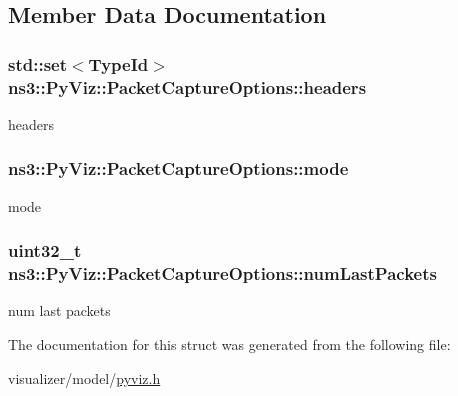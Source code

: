 \subsection{Member Data Documentation}
\subsubsection[{\texorpdfstring{headers}{headers}}]{\setlength{\rightskip}{0pt plus 5cm}std\+::set$<${\bf Type\+Id}$>$ ns3\+::\+Py\+Viz\+::\+Packet\+Capture\+Options\+::headers}\hypertarget{structns3_1_1PyViz_1_1PacketCaptureOptions_ad59cd9cdfe4df5223e037b561ea21d26}{}\label{structns3_1_1PyViz_1_1PacketCaptureOptions_ad59cd9cdfe4df5223e037b561ea21d26}


headers 

\subsubsection[{\texorpdfstring{mode}{mode}}]{ ns3\+::\+Py\+Viz\+::\+Packet\+Capture\+Options\+::mode}\hypertarget{structns3_1_1PyViz_1_1PacketCaptureOptions_a0318a6f8e0ceff173b86f272b687b5a5}{}\label{structns3_1_1PyViz_1_1PacketCaptureOptions_a0318a6f8e0ceff173b86f272b687b5a5}


mode 

\subsubsection[{\texorpdfstring{num\+Last\+Packets}{numLastPackets}}]{\setlength{\rightskip}{0pt plus 5cm}uint32\+\_\+t ns3\+::\+Py\+Viz\+::\+Packet\+Capture\+Options\+::num\+Last\+Packets}\hypertarget{structns3_1_1PyViz_1_1PacketCaptureOptions_a97e06e581617e9aced369d0a7968962c}{}\label{structns3_1_1PyViz_1_1PacketCaptureOptions_a97e06e581617e9aced369d0a7968962c}


num last packets 



The documentation for this struct was generated from the following file\+:\begin{DoxyCompactItemize}
\item 
visualizer/model/\hyperlink{pyviz_8h}{pyviz.\+h}\end{DoxyCompactItemize}
